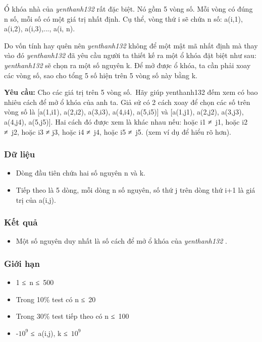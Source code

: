 

Ổ khóa nhà của \emph{ yenthanh132 } rất đặc biệt. Nó gồm 5 vòng số. Mỗi vòng có đúng n số, mỗi số có một giá trị nhất định. Cụ thể, vòng thứ i sẽ chứa n số: a(i,1), a(i,2), a(i,3),..., a(i, n).

Do vốn tính hay quên nên \emph{ yenthanh132 } không để một mật mã nhất định mà thay vào đó \emph{ yenthanh132 } đã yêu cầu người ta thiết kế ra một ổ khóa đặt biệt như sau: \emph{ yenthanh132 } sẽ chọn ra một số nguyên k. Để mở được ổ khóa, ta cần phải xoay các vòng số, sao cho tổng 5 số hiện trên 5 vòng số này bằng k.

\textbf{Yêu cầu: } Cho các giá trị trên 5 vòng số. Hãy giúp yenthanh132 đếm xem có bao nhiêu cách để mở ổ khóa của anh ta. Giả sử có 2 cách xoay để chọn các số trên vòng số là [a(1,i1), a(2,i2), a(3,i3), a(4,i4), a(5,i5)] và [a(1,j1), a(2,j2), a(3,j3), a(4,j4), a(5,j5)]. Hai cách đó được xem là khác nhau nếu: hoặc i1 ≠ j1, hoặc i2 ≠ j2, hoặc i3 ≠ j3, hoặc i4 ≠ j4, hoặc i5 ≠ j5. (xem ví dụ để hiểu rõ hơn).

\subsubsection{Dữ liệu}
\begin{itemize}
	\item Dòng đầu tiên chứa hai số nguyên n và k.
	\item Tiếp theo là 5 dòng, mỗi dòng n số nguyên, số thứ j trên dòng thứ i+1 là giá trị của a(i,j).
\end{itemize}

\subsubsection{Kết quả}
\begin{itemize}
	\item Một số nguyên duy nhất là số cách để mở ổ khóa của \emph{ yenthanh132 } .
\end{itemize}

\subsubsection{Giới hạn}
\begin{itemize}
	\item 1 ≤ n ≤ 500
	\item Trong 10\% test có n ≤ 20
	\item Trong 30\% test tiếp theo có n ≤ 100
	\item -$10^{9}$ ≤ a(i,j), k ≤ $10^{9}$
\end{itemize}

